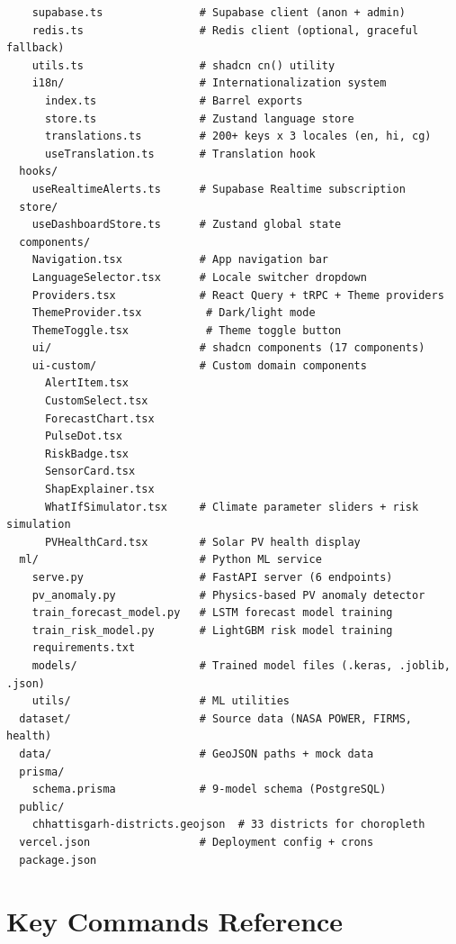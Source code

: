 \documentclass[12pt,a4paper]{report}
\begin{document}
\begin{lstlisting}
    supabase.ts               # Supabase client (anon + admin)
    redis.ts                  # Redis client (optional, graceful fallback)
    utils.ts                  # shadcn cn() utility
    i18n/                     # Internationalization system
      index.ts                # Barrel exports
      store.ts                # Zustand language store
      translations.ts         # 200+ keys x 3 locales (en, hi, cg)
      useTranslation.ts       # Translation hook
  hooks/
    useRealtimeAlerts.ts      # Supabase Realtime subscription
  store/
    useDashboardStore.ts      # Zustand global state
  components/
    Navigation.tsx            # App navigation bar
    LanguageSelector.tsx      # Locale switcher dropdown
    Providers.tsx             # React Query + tRPC + Theme providers
    ThemeProvider.tsx          # Dark/light mode
    ThemeToggle.tsx            # Theme toggle button
    ui/                       # shadcn components (17 components)
    ui-custom/                # Custom domain components
      AlertItem.tsx
      CustomSelect.tsx
      ForecastChart.tsx
      PulseDot.tsx
      RiskBadge.tsx
      SensorCard.tsx
      ShapExplainer.tsx
      WhatIfSimulator.tsx     # Climate parameter sliders + risk simulation
      PVHealthCard.tsx        # Solar PV health display
  ml/                         # Python ML service
    serve.py                  # FastAPI server (6 endpoints)
    pv_anomaly.py             # Physics-based PV anomaly detector
    train_forecast_model.py   # LSTM forecast model training
    train_risk_model.py       # LightGBM risk model training
    requirements.txt
    models/                   # Trained model files (.keras, .joblib, .json)
    utils/                    # ML utilities
  dataset/                    # Source data (NASA POWER, FIRMS, health)
  data/                       # GeoJSON paths + mock data
  prisma/
    schema.prisma             # 9-model schema (PostgreSQL)
  public/
    chhattisgarh-districts.geojson  # 33 districts for choropleth
  vercel.json                 # Deployment config + crons
  package.json
\end{lstlisting}

\section{Key Commands Reference}
\end{document}
